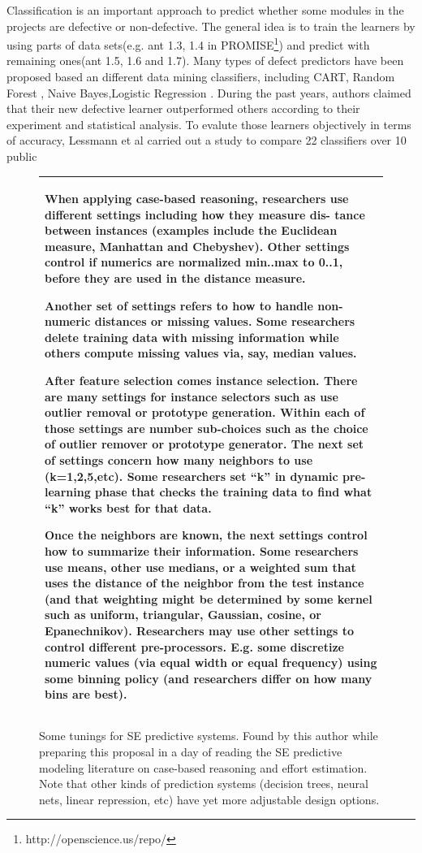 \documentclass{sig-alternative}
\begin{document}
Classification is an important approach to predict whether some modules in the projects are 
defective or non-defective. The general idea is to train the learners by using parts of data 
sets(e.g. ant 1.3, 1.4 in PROMISE\footnote{http://openscience.us/repo/}) and predict with 
remaining ones(ant 1.5, 1.6 and 1.7). Many types of defect predictors have been proposed 
based an different data mining classifiers, including CART, Random Forest 
\cite{guo2004robust},  Naive Bayes\cite{menzies2007data},Logistic Regression 
\cite{khoshgoftaar1999logistic}. During the past years, authors claimed that their new 
defective learner outperformed others according to their experiment and statistical analysis. 
To evalute those learners objectively in terms of accuracy, Lessmann et al
\cite{lessmann2008benchmarking} carried out a study to compare 22 classifiers over 10 public 
\begin{figure}
\small
\begin{tabular}{|p{.95\linewidth}|}\hline
When applying case-based reasoning, researchers use different settings including how they measure dis- tance between instances (examples include the Euclidean measure, Manhattan and Chebyshev). Other settings control if numerics are normalized min..max to 0..1, before they are used in the distance measure.

Another set of settings refers to how to handle non-numeric distances or missing values. Some researchers delete training data with missing information while others compute missing values via, say, median values.

After feature selection comes instance selection. There are many settings for instance selectors such as use outlier removal or prototype generation. Within each of those settings are number sub-choices such as the choice of outlier remover or prototype generator.
The next set of settings concern how many neighbors to use (k=1,2,5,etc). Some researchers set ``k'' in dynamic pre-learning phase that checks the training data to find what ``k'' works best for that data.

Once the neighbors are known, the next settings control how to summarize their information. Some researchers use means, other use medians, or a weighted sum that uses the distance of the neighbor from the test instance (and that weighting might be determined by some kernel such as uniform, triangular, Gaussian, cosine, or Epanechnikov).
Researchers may use other settings to control different pre-processors. E.g. some discretize numeric values (via equal width or equal frequency) using some binning policy (and researchers differ on how many bins are best).\\\hline
\end{tabular}
\caption{Some tunings for SE predictive systems. Found by this author while preparing this proposal in a day of reading the SE predictive modeling literature on case-based reasoning and effort estimation. Note that other kinds of prediction systems (decision trees, neural nets, linear repression, etc) have yet more adjustable design options.}\label{fig:adjust}
\end{figure}
\end{document}
